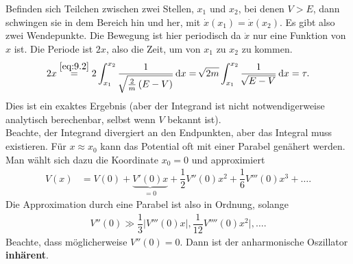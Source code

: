 \documentclass[a4paper,12pt]{article}
\newcommand{\td}{\,\text{d}}
\numberwithin{equation}{section}
\begin{document}
Befinden sich Teilchen zwischen zwei Stellen, $x_1$ und $x_2$, bei denen $V>E$, dann schwingen sie in dem Bereich hin und her, mit $\dot{x}\left(x_1\right)=\dot{x}\left(x_2\right)$. Es gibt also zwei Wendepunkte. Die Bewegung ist hier periodisch da $\dot{x}$ nur eine Funktion von $x$ ist. Die Periode ist $2x$, also die Zeit, um von $x_1$ zu $x_2$ zu kommen.
\begin{align} 
        2x\stackrel{\eqref{eq:9.2}}{=}2\int_{x_1}^{x_2}\dfrac{1}{\,\sqrt[]{\tfrac{2}{m}\left(E-V\right)}}\td x=\,\sqrt[]{2m}\int_{x_1}^{x_2}\dfrac{1}{\,\sqrt[]{E-V}}\td x=\tau \label{eq:9.3}
.\end{align} 
Dies ist ein exaktes Ergebnis (aber der Integrand ist nicht notwendigerweise analytisch berechenbar, selbst wenn $V$ bekannt ist).\\\indent
Beachte, der Integrand divergiert an den Endpunkten, aber das Integral muss existieren. Für $x\approx x_0$ kann das Potential oft mit einer Parabel genähert werden. Man wählt sich dazu die Koordinate $x_0=0$ und approximiert
\begin{align} 
        V\left(x\right)&=V\left(0\right)+\underbrace{V'\left(0\right)x}_{=0}+\dfrac{1}{2}V''\left(0\right)x^2+\dfrac{1}{6}V'''\left(0\right)x^3+\hdots \label{eq:9.4}
.\end{align} 
Die Approximation durch eine Parabel ist also in Ordnung, solange
\begin{align} 
        V''\left(0\right)\gg \dfrac{1}{3}|V'''\left(0\right)x|,\dfrac{1}{12}V''''\left(0\right)x^2|,\hdots \label{eq:9.5}
.\end{align} 
Beachte, dass möglicherweise $V''\left(0\right)=0$. Dann ist der anharmonische Oszillator \textbf{inhärent}.
\end{document}
